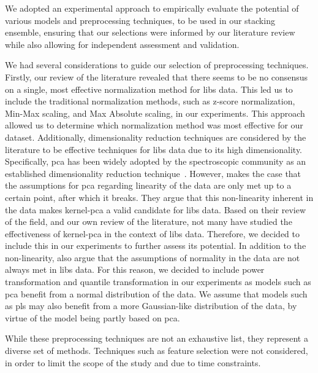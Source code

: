 We adopted an experimental approach to empirically evaluate the potential of various models and preprocessing techniques, to be used in our stacking ensemble, ensuring that our selections were informed by our literature review while also allowing for independent assessment and validation.

We had several considerations to guide our selection of preprocessing techniques.
Firstly, our review of the literature revealed that there seems to be no consensus on a single, most effective normalization method for \gls{libs} data.
This led us to include the traditional normalization methods, such as z-score normalization, Min-Max scaling, and Max Absolute scaling, in our experiments.
This approach allowed us to determine which normalization method was most effective for our dataset. 
Additionally, dimensionality reduction techniques are considered by the literature to be effective techniques for \gls{libs} data due to its high dimensionality. Specifically, \gls{pca} has been widely adopted by the spectroscopic community as an established dimensionality reduction technique~\cite{pca_review_paper}. However, \citet{pca_review_paper} makes the case that the assumptions for \gls{pca} regarding linearity of the data are only met up to a certain point, after which it breaks. They argue that this non-linearity inherent in the data makes \gls{kernel-pca} a valid candidate for \gls{libs} data. Based on their review of the field, and our own review of the literature, not many have studied the effectiveness of \gls{kernel-pca} in the context of \gls{libs} data. Therefore, we decided to include this in our experiments to further assess its potential. In addition to the non-linearity, \citet{pca_review_paper} also argue that the assumptions of normality in the data are not always met in \gls{libs} data. For this reason, we decided to include power transformation and quantile transformation in our experiments as models such as \gls{pca} benefit from a normal distribution of the data. We assume that models such as \gls{pls} may also benefit from a more Gaussian-like distribution of the data, by virtue of the model being partly based on \gls{pca}.

While these preprocessing techniques are not an exhaustive list, they represent a diverse set of methods.
Techniques such as feature selection were not considered, in order to limit the scope of the study and due to time constraints.


